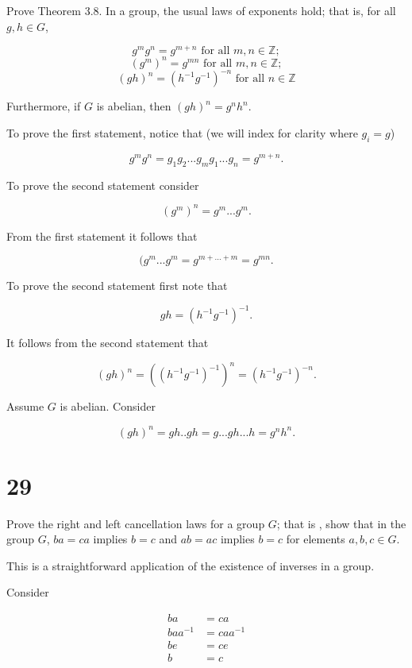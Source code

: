 \documentclass[a4paper]{article}
\begin{document}
Prove Theorem 3.8. In a group, the usual laws of exponents hold; that is, for all $g, h \in G$,

$$g^m g^n = g^{m+n} \text{ for all } m,n \in \mathbb{Z};$$
$$(g^m)^n = g^{mn} \text{ for all } m,n \in \mathbb{Z};$$
$$(gh)^n = (h^{-1} g^{-1})^{-n} \text{ for all } n \in \mathbb{Z}$$

Furthermore, if $G$ is abelian, then $(gh)^n = g^n h^n$.

\vspace{\baselineskip}

To prove the first statement, notice that (we will index for clarity where $g_i = g$)

$$g^m g^n = g_1 g_2 ... g_m g_1 ... g_n =  g^{m+n}.$$

To prove the second statement consider 

$$(g^m)^n = g^m ... g^m.$$

From the first statement it follows that 

$$(g^m ... g^m = g^{m+...+m} = g^{mn}.$$

To prove the second statement first note that

$$gh = (h^{-1} g^{-1})^{-1}.$$

It follows from the second statement that 

$$(gh)^n = ((h^{-1} g^{-1})^{-1})^n = (h^{-1} g^{-1})^{-n}.$$

Assume $G$ is abelian. Consider 

$$(gh)^n = gh .. gh = g...g h...h = g^n h^n.$$

\section*{29}

Prove the right and left cancellation laws for a group $G$; that is , show that in the group $G$, $ba = ca$ implies $b = c$ and $ab = ac$ implies $b = c$ for elements $a,b,c \in G$.

\vspace{\baselineskip}

This is a straightforward application of the existence of inverses in a  group.

Consider

\begin{align*}
ba &= ca \\
baa^{-1} &= caa^{-1} \\
be &= ce \\ 
b &= c
\end{align*}
\end{document}
